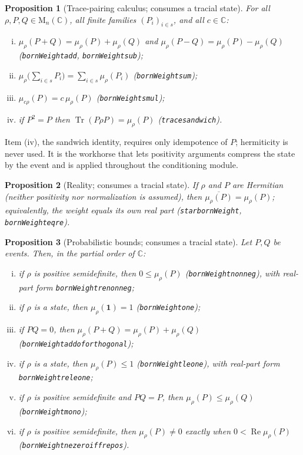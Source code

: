 \documentclass[11pt]{article}
\renewcommand{\_}{\textunderscore\allowbreak}
\newtheorem{proposition}{Proposition}
\theoremstyle{remark}
\newcommand{\C}{\mathbb C}
\newcommand{\Mn}{\mathrm{M}_n(\C)}
\newcommand{\Tr}{\operatorname{Tr}}
\newcommand{\one}{\mathbf 1}
\begin{document}
\begin{proposition}[Trace-pairing calculus; consumes a tracial state]
\label{prop:pairing}
For all $\rho, P, Q \in \Mn$, all finite families $(P_i)_{i \in s}$, and all $c \in \C$:
\begin{enumerate}[(i)]
\item $\mu_\rho(P + Q) = \mu_\rho(P) + \mu_\rho(Q)$ and $\mu_\rho(P - Q) = \mu_\rho(P) - \mu_\rho(Q)$ (\texttt{bornWeight\_add}, \texttt{bornWeight\_sub});
\item $\mu_\rho\bigl(\sum_{i \in s} P_i\bigr) = \sum_{i \in s} \mu_\rho(P_i)$ (\texttt{bornWeight\_sum});
\item $\mu_{c\rho}(P) = c\, \mu_\rho(P)$ (\texttt{bornWeight\_smul});
\item if $P^2 = P$ then $\Tr(P \rho P) = \mu_\rho(P)$ (\texttt{trace\_sandwich}).
\end{enumerate}
\end{proposition}

Item (iv), the sandwich identity, requires only idempotence of $P$; hermiticity is never used. It is the workhorse that lets positivity arguments compress the state by the event and is applied throughout the conditioning module.

\begin{proposition}[Reality; consumes a tracial state]
\label{prop:reality}
If $\rho$ and $P$ are Hermitian (neither positivity nor normalization is assumed), then $\overline{\mu_\rho(P)} = \mu_\rho(P)$; equivalently, the weight equals its own real part (\texttt{star\_bornWeight}, \texttt{bornWeight\_eq\_re}).
\end{proposition}

\begin{proposition}[Probabilistic bounds; consumes a tracial state]
\label{prop:prob}
Let $P, Q$ be events. Then, in the partial order of $\C$:
\begin{enumerate}[(i)]
\item if $\rho$ is positive semidefinite, then $0 \le \mu_\rho(P)$ (\texttt{bornWeight\_nonneg}), with real-part form \texttt{bornWeight\_re\_nonneg};
\item if $\rho$ is a state, then $\mu_\rho(\one) = 1$ (\texttt{bornWeight\_one});
\item if $PQ = 0$, then $\mu_\rho(P + Q) = \mu_\rho(P) + \mu_\rho(Q)$ (\texttt{bornWeight\_add\_of\_orthogonal});
\item if $\rho$ is a state, then $\mu_\rho(P) \le 1$ (\texttt{bornWeight\_le\_one}), with real-part form \texttt{bornWeight\_re\_le\_one};
\item if $\rho$ is positive semidefinite and $PQ = P$, then $\mu_\rho(P) \le \mu_\rho(Q)$ (\texttt{bornWeight\_mono});
\item if $\rho$ is positive semidefinite, then $\mu_\rho(P) \neq 0$ exactly when $0 < \operatorname{Re} \mu_\rho(P)$ (\texttt{bornWeight\_ne\_zero\_iff\_re\_pos}).
\end{enumerate}
\end{proposition}
\end{document}
